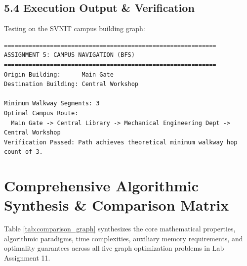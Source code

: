 \documentclass[12pt]{article}
\begin{document}
\subsection*{5.4 Execution Output \& Verification}
Testing on the SVNIT campus building graph:
\begin{lstlisting}
============================================================
ASSIGNMENT 5: CAMPUS NAVIGATION (BFS)
============================================================
Origin Building:      Main Gate
Destination Building: Central Workshop

Minimum Walkway Segments: 3
Optimal Campus Route:
  Main Gate -> Central Library -> Mechanical Engineering Dept -> Central Workshop
Verification Passed: Path achieves theoretical minimum walkway hop count of 3.
\end{lstlisting}

\newpage

\section*{Comprehensive Algorithmic Synthesis \& Comparison Matrix}

Table \ref{tab:comparison_graph} synthesizes the core mathematical properties, algorithmic paradigms, time complexities, auxiliary memory requirements, and optimality guarantees across all five graph optimization problems in Lab Assignment 11.
\end{document}
